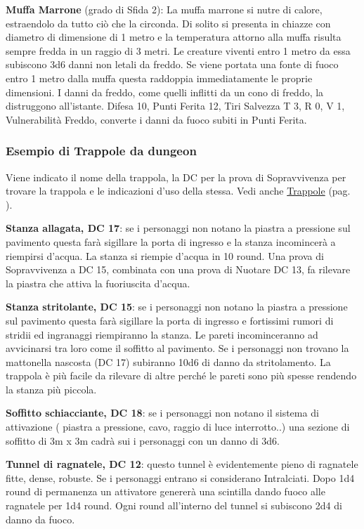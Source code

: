 \begin{multicols}{2}
\textbf{Muffa Marrone} (grado di Sfida 2): La muffa marrone si nutre di calore, estraendolo da tutto ciò che la circonda. Di solito si presenta in chiazze con diametro di dimensione di 1 metro e la temperatura attorno alla muffa risulta sempre fredda in un raggio di 3 metri. Le creature viventi entro 1 metro da essa subiscono 3d6 danni non letali da freddo. Se viene portata una fonte di fuoco entro 1 metro dalla muffa questa raddoppia immediatamente le proprie dimensioni. I danni da freddo, come quelli inflitti da un cono di freddo, la distruggono all'istante. Difesa 10, Punti Ferita 12, Tiri Salvezza T 3, R 0, V 1, Vulnerabilità Freddo, converte i danni da fuoco subiti in Punti Ferita.

\subsubsection{Esempio di Trappole da dungeon}

Viene indicato il nome della trappola, la DC per la prova di Sopravvivenza per trovare la trappola e le indicazioni d'uso della stessa. Vedi anche \hyperlink{trappoleesempio}{Trappole} (pag. \pageref{trappoleesempio}).

\medskip

\textbf{Stanza allagata, DC 17}: se i personaggi non notano la piastra a pressione sul pavimento questa farà sigillare la porta di ingresso e la stanza incomincerà a riempirsi d'acqua.
La stanza si riempie d'acqua in 10 round. Una prova di Sopravvivenza a DC 15, combinata con una prova di Nuotare DC 13, fa rilevare la piastra che attiva la fuoriuscita d'acqua.

\textbf{Stanza stritolante, DC 15}: se i personaggi non notano la piastra a pressione sul pavimento questa farà sigillare la porta di ingresso e fortissimi rumori di stridii ed ingranaggi riempiranno la stanza. Le pareti incominceranno ad avvicinarsi tra loro come il soffitto al pavimento. Se i personaggi non trovano la mattonella nascosta (DC 17) subiranno 10d6 di danno da stritolamento. La trappola è più facile da rilevare di altre perché le pareti sono più spesse rendendo la stanza più piccola.

\textbf{Soffitto schiacciante, DC 18}: se i personaggi non notano il sistema di attivazione ( piastra a pressione, cavo, raggio di luce interrotto..) una sezione di soffitto di 3m x 3m cadrà sui i personaggi con un danno di 3d6.

\textbf{Tunnel di ragnatele, DC 12}: questo tunnel è evidentemente pieno di ragnatele fitte, dense, robuste. Se i personaggi entrano si considerano Intralciati. Dopo 1d4 round di permanenza un attivatore genererà una scintilla dando fuoco alle ragnatele per 1d4 round. Ogni round all'interno del tunnel si subiscono 2d4 di danno da fuoco.


\end{multicols}
